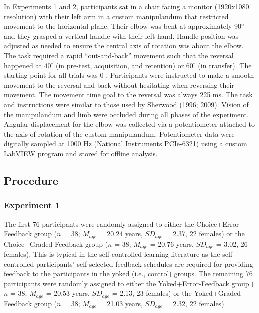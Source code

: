 \documentclass[
  doc, donotrepeattitle,floatsintext]{apa7}
\begin{document}
In Experiments 1 and 2, participants sat in a chair facing a monitor (1920x1080 resolution) with their left arm in a custom manipulandum that restricted movement to the horizontal plane. Their elbow was bent at approximately 90° and they grasped a vertical handle with their left hand. Handle position was adjusted as needed to ensure the central axis of rotation was about the elbow. The task required a rapid ``out-and-back'' movement such that the reversal happened at \(40^\circ\) (in pre-test, acquisition, and retention) or \(60^\circ\) (in transfer). The starting point for all trials was \(0^\circ\). Participants were instructed to make a smooth movement to the reversal and back without hesitating when reversing their movement. The movement time goal to the reversal was always 225 ms. The task and instructions were similar to those used by Sherwood (1996; 2009). Vision of the manipulandum and limb were occluded during all phases of the experiment. Angular displacement for the elbow was collected via a potentiometer attached to the axis of rotation of the custom manipulandum. Potentiometer data were digitally sampled at 1000 Hz (National Instruments PCIe-6321) using a custom LabVIEW program and stored for offline analysis.

\hypertarget{procedure}{%
\subsection{Procedure}\label{procedure}}

\hypertarget{experiment-1-1}{%
\subsubsection{Experiment 1}\label{experiment-1-1}}

The first 76 participants were randomly assigned to either the Choice+Error-Feedback group (\(n\) = 38; \(M_{age}\) = 20.24 years, \(SD_{age}\) = 2.37, 22 females) or the Choice+Graded-Feedback group (\(n\) = 38; \(M_{age}\) = 20.76 years, \(SD_{age}\) = 3.02, 26 females). This is typical in the self-controlled learning literature as the self-controlled participants' self-selected feedback schedules are required for providing feedback to the participants in the yoked (i.e., control) groups. The remaining 76 participants were randomly assigned to either the Yoked+Error-Feedback group (\(n\) = 38; \(M_{age}\) = 20.53 years, \(SD_{age}\) = 2.13, 23 females) or the Yoked+Graded-Feedback group (\(n\) = 38; \(M_{age}\) = 21.03 years, \(SD_{age}\) = 2.32, 22 females).
\end{document}
